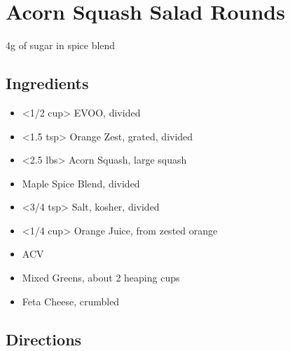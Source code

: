 \section{Acorn Squash Salad Rounds}

4g of sugar in spice blend

\subsection{ Ingredients }

\begin{itemize}
  \item <1/2 cup> EVOO, divided
  \item <1.5 tsp> Orange Zest, grated, divided
  \item <2.5 lbs> Acorn Squash, large squash
  \item <3 tsp> Maple Spice Blend, divided
  \item <3/4 tsp> Salt, kosher, divided
  \item <1/4 cup> Orange Juice, from zested orange
  \item <1 tbs> ACV
  \item <3 oz> Mixed Greens, about 2 heaping cups 
  \item <2 oz> Feta Cheese, crumbled
\end{itemize}

\subsection{ Directions }

